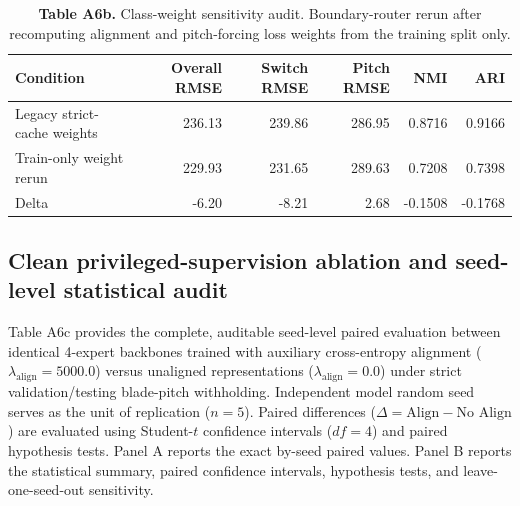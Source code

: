 \documentclass[
  journal]{IEEEtran}
\begin{document}
\begin{table}[!t]
\centering
\fontsize{8.0pt}{9.6pt}\selectfont
\setlength{\tabcolsep}{3pt}
\renewcommand{\arraystretch}{1.05}
\caption*{\textbf{Table A6b.} Class-weight sensitivity audit. Boundary-router rerun after recomputing alignment and pitch-forcing loss weights from the training split only.}
%
\begin{tabular}{lrrrrr}
\toprule
Condition & Overall RMSE & Switch RMSE & Pitch RMSE & NMI & ARI \\
\midrule
Legacy strict-cache weights & 236.13 & 239.86 & 286.95 & 0.8716 & 0.9166 \\
Train-only weight rerun & 229.93 & 231.65 & 289.63 & 0.7208 & 0.7398 \\
Delta & -6.20 & -8.21 & 2.68 & -0.1508 & -0.1768 \\
\bottomrule
\end{tabular}
\end{table}

\FloatBarrier

\subsection*{Clean privileged-supervision ablation and seed-level
statistical
audit}\label{clean-privileged-supervision-ablation-and-seed-level-statistical-audit}

Table A6c provides the complete, auditable seed-level paired evaluation
between identical 4-expert backbones trained with auxiliary
cross-entropy alignment (\(\lambda_{\text{align}}=5000.0\)) versus
unaligned representations (\(\lambda_{\text{align}}=0.0\)) under strict
validation/testing blade-pitch withholding. Independent model random
seed serves as the unit of replication (\(n=5\)). Paired differences
(\(\Delta = \text{Align} - \text{No Align}\)) are evaluated using
Student-\(t\) confidence intervals (\(df=4\)) and paired hypothesis
tests. Panel A reports the exact by-seed paired values. Panel B reports
the statistical summary, paired confidence intervals, hypothesis tests,
and leave-one-seed-out sensitivity.
\end{document}
